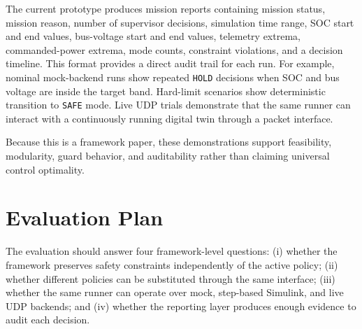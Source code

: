 \documentclass[conference]{IEEEtran}
\begin{document}
The current prototype produces mission reports containing mission status,
mission reason, number of supervisor decisions, simulation time range, SOC
start and end values, bus-voltage start and end values, telemetry extrema,
commanded-power extrema, mode counts, constraint violations, and a decision
timeline. This format provides a direct audit trail for each run. For example,
nominal mock-backend runs show repeated \texttt{HOLD} decisions when SOC and
bus voltage are inside the target band. Hard-limit scenarios show deterministic
transition to \texttt{SAFE} mode. Live UDP trials demonstrate that the same
runner can interact with a continuously running digital twin through a packet
interface.

Because this is a framework paper, these demonstrations support feasibility,
modularity, guard behavior, and auditability rather than claiming universal
control optimality.

\section{Evaluation Plan}

The evaluation should answer four framework-level questions: (i) whether the
framework preserves safety constraints independently of the active policy;
(ii) whether different policies can be substituted through the same interface;
(iii) whether the same runner can operate over mock, step-based Simulink, and
live UDP backends; and (iv) whether the reporting layer produces enough
evidence to audit each decision.
\end{document}
